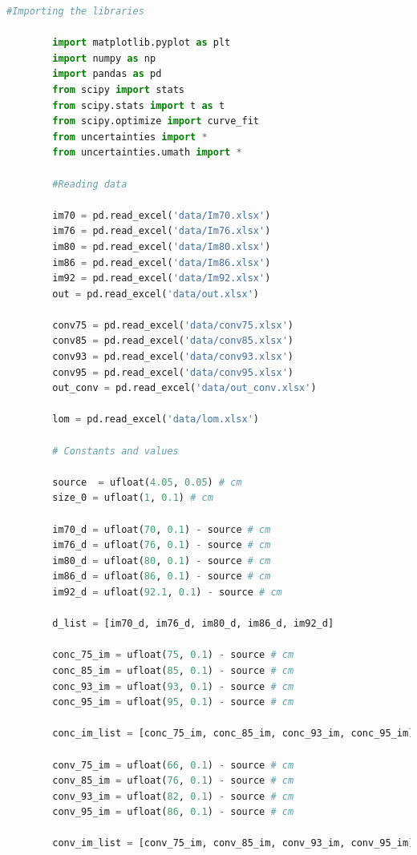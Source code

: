 \documentclass[a4paper,11pt]{article}
\begin{document}
    \begin{lstlisting}[language=Python, basicstyle=\tiny, breaklines=true, postbreak=\mbox{\textbackslashspace}]
        #Importing the libraries

        import matplotlib.pyplot as plt
        import numpy as np
        import pandas as pd
        from scipy import stats
        from scipy.stats import t as t 
        from scipy.optimize import curve_fit
        from uncertainties import *
        from uncertainties.umath import *

        #Reading data

        im70 = pd.read_excel('data/Im70.xlsx')
        im76 = pd.read_excel('data/Im76.xlsx')
        im80 = pd.read_excel('data/Im80.xlsx')
        im86 = pd.read_excel('data/Im86.xlsx')
        im92 = pd.read_excel('data/Im92.xlsx')
        out = pd.read_excel('data/out.xlsx')

        conv75 = pd.read_excel('data/conv75.xlsx')
        conv85 = pd.read_excel('data/conv85.xlsx')
        conv93 = pd.read_excel('data/conv93.xlsx')
        conv95 = pd.read_excel('data/conv95.xlsx')
        out_conv = pd.read_excel('data/out_conv.xlsx')

        lom = pd.read_excel('data/lom.xlsx')

        # Constants and values

        source  = ufloat(4.05, 0.05) # cm
        size_0 = ufloat(1, 0.1) # cm

        im70_d = ufloat(70, 0.1) - source # cm
        im76_d = ufloat(76, 0.1) - source # cm
        im80_d = ufloat(80, 0.1) - source # cm
        im86_d = ufloat(86, 0.1) - source # cm
        im92_d = ufloat(92.1, 0.1) - source # cm

        d_list = [im70_d, im76_d, im80_d, im86_d, im92_d]

        conc_75_im = ufloat(75, 0.1) - source # cm
        conc_85_im = ufloat(85, 0.1) - source # cm
        conc_93_im = ufloat(93, 0.1) - source # cm
        conc_95_im = ufloat(95, 0.1) - source # cm 

        conc_im_list = [conc_75_im, conc_85_im, conc_93_im, conc_95_im]

        conv_75_im = ufloat(66, 0.1) - source # cm
        conv_85_im = ufloat(76, 0.1) - source # cm
        conv_93_im = ufloat(82, 0.1) - source # cm
        conv_95_im = ufloat(86, 0.1) - source # cm

        conv_im_list = [conv_75_im, conv_85_im, conv_93_im, conv_95_im]


\end{lstlisting}
\end{document}
